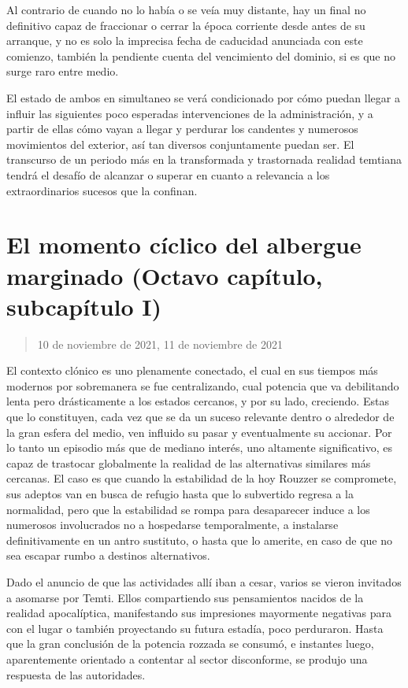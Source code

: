 \documentclass[
  spanish,
]{book}
\begin{document}
Al contrario de cuando no lo había o se veía muy distante, hay un final no definitivo capaz de fraccionar o cerrar la época corriente desde antes de su arranque, y no es solo la imprecisa fecha de caducidad anunciada con este comienzo, también la pendiente cuenta del vencimiento del dominio, si es que no surge raro entre medio.

El estado de ambos en simultaneo se verá condicionado por cómo puedan llegar a influir las siguientes poco esperadas intervenciones de la administración, y a partir de ellas cómo vayan a llegar y perdurar los candentes y numerosos movimientos del exterior, así tan diversos conjuntamente puedan ser. El transcurso de un periodo más en la transformada y trastornada realidad temtiana tendrá el desafío de alcanzar o superar en cuanto a relevancia a los extraordinarios sucesos que la confinan.

\hypertarget{el-momento-cuxedclico-del-albergue-marginado-octavo-capuxedtulo-subcapuxedtulo-i}{%
\section{El momento cíclico del albergue marginado (Octavo capítulo, subcapítulo I)}\label{el-momento-cuxedclico-del-albergue-marginado-octavo-capuxedtulo-subcapuxedtulo-i}}

\begin{quote}
10 de noviembre de 2021, 11 de noviembre de 2021
\end{quote}

El contexto clónico es uno plenamente conectado, el cual en sus tiempos más modernos por sobremanera se fue centralizando, cual potencia que va debilitando lenta pero drásticamente a los estados cercanos, y por su lado, creciendo. Estas que lo constituyen, cada vez que se da un suceso relevante dentro o alrededor de la gran esfera del medio, ven influido su pasar y eventualmente su accionar. Por lo tanto un episodio más que de mediano interés, uno altamente significativo, es capaz de trastocar globalmente la realidad de las alternativas similares más cercanas. El caso es que cuando la estabilidad de la hoy Rouzzer se compromete, sus adeptos van en busca de refugio hasta que lo subvertido regresa a la normalidad, pero que la estabilidad se rompa para desaparecer induce a los numerosos involucrados no a hospedarse temporalmente, a instalarse definitivamente en un antro sustituto, o hasta que lo amerite, en caso de que no sea escapar rumbo a destinos alternativos.

Dado el anuncio de que las actividades allí iban a cesar, varios se vieron invitados a asomarse por Temti. Ellos compartiendo sus pensamientos nacidos de la realidad apocalíptica, manifestando sus impresiones mayormente negativas para con el lugar o también proyectando su futura estadía, poco perduraron. Hasta que la gran conclusión de la potencia rozzada se consumó, e instantes luego, aparentemente orientado a contentar al sector disconforme, se produjo una respuesta de las autoridades.
\end{document}
